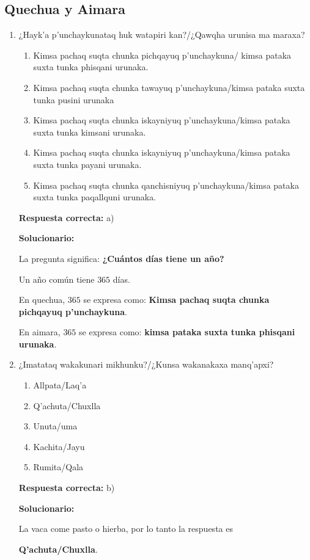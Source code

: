 \subsection*{Quechua y Aimara}

\begin{enumerate}[resume]

	
	\item ¿Hayk’a p’unchaykunataq huk watapiri kan?/¿Qawqha urunisa ma maraxa?
	\begin{enumerate}[label=\alph*)]
		\item Kimsa pachaq suqta chunka pichqayuq p’unchaykuna/ kimsa pataka suxta tunka phisqani urunaka.
		\item Kimsa pachaq suqta chunka tawayuq p’unchaykuna/kimsa pataka suxta tunka pusini urunaka
		\item Kimsa pachaq suqta chunka iskayniyuq p’unchaykuna/kimsa pataka suxta tunka kimsani urunaka.
		\item Kimsa pachaq suqta chunka iskayniyuq p’unchaykuna/kimsa pataka suxta tunka payani urunaka.
		\item Kimsa pachaq suqta chunka qanchisniyuq p’unchaykuna/kimsa pataka suxta tunka paqallquni urunaka.
	\end{enumerate}
	\textbf{Respuesta correcta:} a)
	
	\vspace{2mm}
	\textbf{Solucionario:}
	
	La pregunta significa: \textbf{¿Cuántos días tiene un año?}
	
	Un año común tiene $365$ días.
	
	En quechua, $365$ se expresa como:
	\textbf{Kimsa pachaq suqta chunka pichqayuq p’unchaykuna}.
	
	En aimara, $365$ se expresa como:
	\textbf{kimsa pataka suxta tunka phisqani urunaka}.
	
	\vspace{6mm}
	
	\item ¿Imatataq wakakunari mikhunku?/¿Kunsa wakanakaxa manq’apxi?
	\begin{enumerate}[label=\alph*)]
		\item Allpata/Laq’a
		\item Q’achuta/Chuxlla
		\item Unuta/uma
		\item Kachita/Jayu
		\item Rumita/Qala
	\end{enumerate}
	\textbf{Respuesta correcta:} b)
	
	\vspace{2mm}
	\textbf{Solucionario:}
	
	La vaca come pasto o hierba, por lo tanto la respuesta es 
	
	\textbf{Q’achuta/Chuxlla}.
	
	\vspace{6mm}
	
\end{enumerate}

